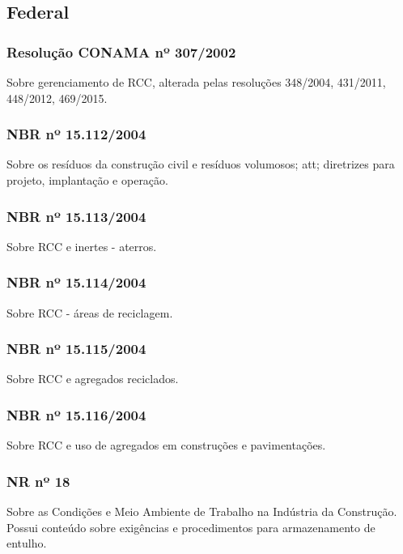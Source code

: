 \subsection{Federal}
\begin{subapend}
	\begin{subsubapend}
		\item \subsubsection{Resolução CONAMA nº 307/2002}
		Sobre gerenciamento de RCC, alterada pelas resoluções 348/2004, 431/2011, 448/2012, 469/2015.
		\subsubsection{NBR nº 15.112/2004}
		Sobre os resíduos da construção civil e resíduos volumosos; \gls{att}; diretrizes para projeto, implantação e operação.
		\subsubsection{NBR nº 15.113/2004}
		Sobre RCC e inertes - aterros.
		\subsubsection{NBR nº 15.114/2004}
		Sobre RCC - áreas de reciclagem.
		\subsubsection{NBR nº 15.115/2004}
		Sobre RCC e agregados reciclados.
		\subsubsection{NBR nº 15.116/2004}
		Sobre RCC e uso de agregados em construções e pavimentações.
		\subsubsection{NR nº 18}
		Sobre as Condições e Meio Ambiente de Trabalho na Indústria da Construção. Possui conteúdo sobre exigências e procedimentos para armazenamento de entulho.
	\end{subsubapend}
\end{subapend}


